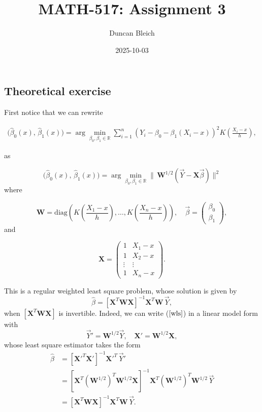 \documentclass[
  letterpaper,
  DIV=11,
  numbers=noendperiod]{scrartcl}
\title{MATH-517: Assignment 3}
\author{Duncan Bleich}
\date{2025-10-03}
\begin{document}
\maketitle


\subsection{Theoretical exercise}\label{theoretical-exercise}

First notice that we can rewrite

\begin{align*}
\Big(\hat{\beta}_0(x), \, \hat{\beta}_1(x)  \Big) = \arg \min_{\beta_0, \beta_1 \in \mathbb{R}} \sum_{i=1}^n \left( Y_i - \beta_0 - \beta_1(X_i - x) \right)^2 K\left(\frac{X_i - x}{h}\right),
\end{align*}

as

\begin{equation} \label{wls}
\Big(\hat{\beta}_0(x), \, \hat{\beta}_1(x)  \Big) = \arg \min_{\beta_0, \beta_1 \in \mathbb{R}} \lVert \, \textbf{W}^{1/2} \left( \vec{Y} - \textbf{X}\vec{\beta}   \right) \rVert^2
\end{equation} where

\[
\textbf{W} = \text{diag}\left( K\left(\frac{X_1 - x}{h}\right), \ldots, K\left( \dfrac{X_n-x}{h}\right) \right), \quad \vec{\beta} = \begin{pmatrix} \beta_0 \\ \beta_1
\end{pmatrix},
\] and

\[
\textbf{X} = \begin{pmatrix}
1 & X_1-x \\
1 & X_2-x\\
\vdots & \vdots \\
1& X_n-x
\end{pmatrix}.
\]

This is a regular weighted least square problem, whose solution is given
by \[
\hat{\beta} = \left[\textbf{X}^T \textbf{W} \textbf{X}\right]^{-1}\textbf{X}^T \textbf{W} \, \vec{Y},
\] when \(\left[\textbf{X}^T \textbf{W} \textbf{X}\right]\) is
invertible. Indeed, we can write (\(\ref{wls}\)) in a linear model form
with \[
\vec{Y}' = \textbf{W}^{1/2} \vec{Y}, \quad \textbf{X}' = \textbf{W}^{1/2} \textbf{X},
\] whose least square estimator takes the form \begin{align*}
\hat{\beta} &= \left[\textbf{X}'^T\textbf{X}'\right]^{-1}\textbf{X}'^T \, \vec{Y}' \\
&= \left[\textbf{X}^T (\textbf{W}^{1/2})^T \textbf{W}^{1/2} \textbf{X}\right]^{-1}\textbf{X}^T (\textbf{W}^{1/2})^T\textbf{W}^{1/2} \, \vec{Y} \\
&= \left[\textbf{X}^T \textbf{W} \textbf{X}\right]^{-1}\textbf{X}^T \textbf{W} \, \vec{Y}.
\end{align*}
\end{document}
